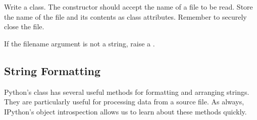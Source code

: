 \begin{problem}
Write a  class.
The constructor should accept the name of a file to be read.
Store the name of the file and its contents as class attributes.
Remember to securely close the file.

If the filename argument is not a string, raise a .
\end{problem}

\subsection*{String Formatting}




Python's  class has several useful methods for formatting and arranging strings.
They are particularly useful for processing data from a source file.
As always, IPython's object introspection allows us to learn about these methods quickly.

